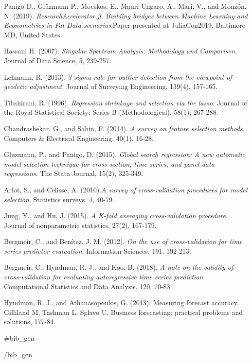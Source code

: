 \documentclass{article}
\begin{document}
\renewcommand{\refname}{ModelSelection References}
  
\begin{thebibliography}{1}
  
Panigo D., Glüzmann P., Mocskos, E., Mauri Ungaro, A., Mari, V., and Monzón, N. (2019). \textit{ResearchAccelerator.jl: Building bridges between Machine Learning and Econometrics in Fat-Data scenarios}.Paper presented at JuliaCon2019, Baltimore-MD, United States.
  
Hassani H. (2007). \textit{Singular Spectrum Analysis: Methodology and Comparison}. Journal of Data Science, 5, 239-257.
  
Lehmann, R. (2013). \textit{3 sigma-rule for outlier detection from the viewpoint of geodetic adjustment}. Journal of Surveying Engineering, 139(4), 157-165.

Tibshirani, R. (1996). \textit{Regression shrinkage and selection via the lasso}. Journal of the Royal Statistical Society: Series B (Methodological), 58(1), 267-288.

Chandrashekar, G., and Sahin, F. (2014). \textit{A survey on feature selection methods}. Computers \& Electrical Engineering, 40(1), 16-28.

Gluzmann, P., and Panigo, D. (2015). \textit{Global search regression: A new automatic model-selection technique for cross-section, time-series, and panel-data regressions.} The Stata Journal, 15(2), 325-349.

Arlot, S., and Celisse, A. (2010).\textit{A survey of cross-validation procedures for model selection}. Statistics surveys, 4, 40-79.

Jung, Y., and Hu, J. (2015). \textit{A K-fold averaging cross-validation procedure}. Journal of nonparametric statistics, 27(2), 167-179.

Bergmeir, C., and Benítez, J. M. (2012). \textit{On the use of cross-validation for time series predictor evaluation}. Information Sciences, 191, 192-213.

Bergmeir, C., Hyndman, R. J., and Koo, B. (2018). \textit{A note on the validity of cross-validation for evaluating autoregressive time series prediction}. Computational Statistics and Data Analysis, 120, 70-83.

Hyndman, R. J., and Athanasopoulos, G. (2013). Measuring forecast accuracy. Gilliland M, Tashman L, Sglavo U. Business forecasting: practical problems and solutions, 177-84.
\end{thebibliography}

{{#bib_gen}}
\renewcommand{\refname}{References results obtained from keywords}
  
\begin{thebibliography}
 
\end{thebibliography}
{{/bib_gen}}
\end{document}
